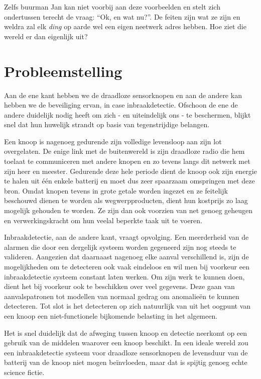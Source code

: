\documentclass[12pt,a4paper,draft]{article}
\begin{document}
Zelfs buurman Jan kan niet voorbij aan deze voorbeelden en stelt zich
ondertussen terecht de vraag: ``Ok, en wat nu?''. De feiten zijn wat ze zijn en
weldra zal elk \emph{ding} op aarde wel een eigen neetwerk adres hebben. Hoe
ziet die wereld er dan eigenlijk uit?

\section*{Probleemstelling}

Aan de ene kant hebben we de draadloze sensorknopen en aan de andere kan hebben
we de beveiliging ervan, in case inbraakdetectie. Ofschoon de ene de andere
duidelijk nodig heeft om zich - en uiteindelijk ons - te beschermen, blijkt
snel dat hun huwelijk strandt op basis van tegenstrijdige belangen.

Een knoop is nagenoeg gedurende zijn volledige levensloop aan zijn lot
overgelaten. De enige link met de buitenwereld is zijn draadloze radio die hem
toelaat te communiceren met andere knopen en zo tevens langs dit netwerk met
zijn heer en meester. Gedurende deze hele periode dient de knoop ook zijn
energie te halen uit \'e\'en enkele batterij en moet dus zeer spaarzaam
omspringen met deze bron. Omdat knopen tevens in grote getale worden ingezet en
ze feitelijk beschouwd dienen te worden als wegwerpproducten, dient hun
kostprijs zo laag mogelijk gehouden te worden. Ze zijn dan ook voorzien van net
genoeg geheugen en verwerkingskracht om hun veelal beperkte taak uit te voeren.

Inbraakdetectie, aan de andere kant, vraagt opvolging. Een meerderheid van de
alarmen die door een dergelijk systeem worden gegeneerd zijn nog steeds te
valideren. Aangezien dat daarnaast nagenoeg elke aanval verschillend is, zijn
de mogelijkheden om te detecteren ook vaak eindeloos en wil men bij voorkeur
een inbraakdetectie systeem constant laten werken. Om zijn werk te kunnen doen,
dient het bij voorkeur ook te beschikken over veel gegevens. Deze gaan van
aanvalspatronen tot modellen van normaal gedrag om anomalie\"en te kunnen
detecteren. Tot slot is het detecteren op zich natuurlijk van uit het oogpunt
van een knoop een niet-functionele bijkomende belasting in het algemeen.

Het is snel duidelijk dat de afweging tussen knoop en detectie neerkomt op een
gebruik van de middelen waarover een knoop beschikt. In een ideale wereld zou
een inbraakdetectie systeem voor draadloze sensorknopen de levensduur van de
batterij van de knoop niet mogen be\"invloeden, maar dat is spijtig genoeg
echte science fictie.
\end{document}
